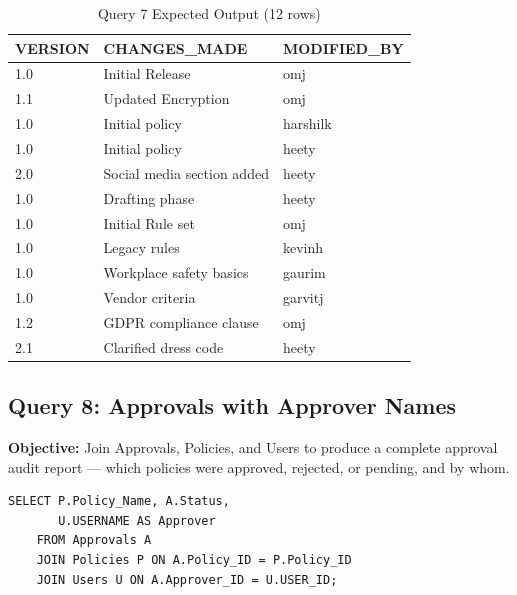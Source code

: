 \documentclass[conference]{IEEEtran}
\begin{document}
\begin{table}[H]
\centering
\caption{Query 7 Expected Output (12 rows)}
\begin{tabular}{|l|l|l|}
\hline
\textbf{VERSION} & \textbf{CHANGES\_MADE} & \textbf{MODIFIED\_BY} \\
\hline
1.0 & Initial Release            & omj      \\
1.1 & Updated Encryption         & omj      \\
1.0 & Initial policy             & harshilk \\
1.0 & Initial policy             & heety    \\
2.0 & Social media section added & heety    \\
1.0 & Drafting phase             & heety    \\
1.0 & Initial Rule set           & omj      \\
1.0 & Legacy rules               & kevinh   \\
1.0 & Workplace safety basics    & gaurim   \\
1.0 & Vendor criteria            & garvitj  \\
1.2 & GDPR compliance clause     & omj      \\
2.1 & Clarified dress code       & heety    \\
\hline
\end{tabular}
\end{table}

\subsection{Query 8: Approvals with Approver Names}

\textbf{Objective:} Join Approvals, Policies, and Users to produce a complete approval audit report — which policies were approved, rejected, or pending, and by whom.

\begin{lstlisting}[style=sqlstyle, caption={Query 8: Approvals Audit (Multi-JOIN)}]
SELECT P.Policy_Name, A.Status,
       U.USERNAME AS Approver
    FROM Approvals A
    JOIN Policies P ON A.Policy_ID = P.Policy_ID
    JOIN Users U ON A.Approver_ID = U.USER_ID;
\end{lstlisting}
\end{document}
